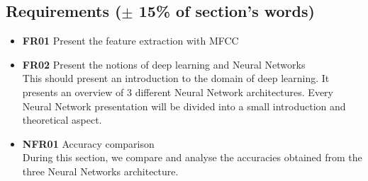 \subsection{Requirements ($\pm$ 15\% of section's words)}

\begin{itemize} 
  \item \textbf{FR01} Present the feature extraction with MFCC \\
  \item \textbf{FR02} Present the notions of deep learning and Neural Networks\\
    This should present an introduction to the domain of deep learning. It
    presents an overview of 3 different Neural Network architectures.  Every
    Neural Network presentation will be divided into a small introduction and
    theoretical aspect.\\
  \item \textbf{NFR01} Accuracy comparison\\
    During this section, we compare and analyse the accuracies obtained from the
    three Neural Networks architecture.
\end{itemize}

